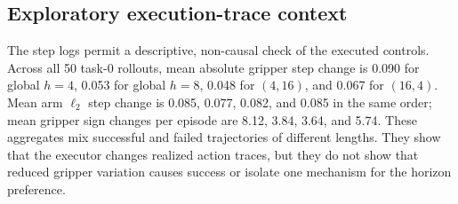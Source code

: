 \subsection{Exploratory execution-trace context}

The step logs permit a descriptive, non-causal check of the executed controls.
Across all 50 task-0 rollouts, mean absolute gripper step change is 0.090 for
global $h=4$, 0.053 for global $h=8$, 0.048 for $(4,16)$, and 0.067 for
$(16,4)$.  Mean arm $\ell_2$ step change is 0.085, 0.077, 0.082, and 0.085 in
the same order; mean gripper sign changes per episode are 8.12, 3.84, 3.64, and
5.74.  These aggregates mix successful and failed trajectories of different
lengths.  They show that the executor changes realized action traces, but they
do not show that reduced gripper variation causes success or isolate one
mechanism for the horizon preference.
